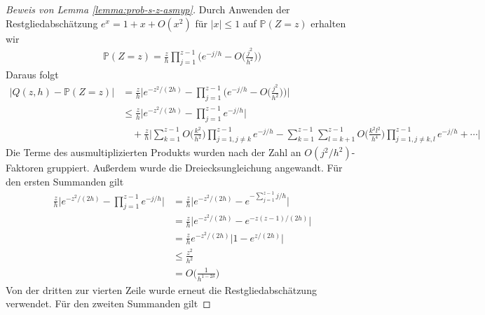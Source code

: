 \documentclass[a4paper, 11pt, ngerman]{article}
\renewcommand{\P}{\mathbb{P}}
\theoremstyle{definition}
\theoremstyle{plain}
\theoremstyle{remark}
\begin{document}
\begin{proof}[Beweis von Lemma \ref{lemma:prob-s-z-asmyp}]
    Durch Anwenden der Restgliedabschätzung $e^x = 1 + x + O(x^2)$ für $|x| \le 1$ auf $\P(Z = z)$ erhalten wir
    \begin{align*}
        \P(Z = z) = \frac z h \prod_{j = 1}^{z - 1}
        \Bigg ( e^{-j/h} - O \bigg (\frac {j^2} {h^2} \bigg ) \Bigg )
    \end{align*}
    Daraus folgt
    \begin{align*}
        \vert Q(z, h) - \P(Z = z) \vert
         & = \frac z h \Bigg \vert
        e^{-z^2/(2h)} -
        \prod_{j = 1}^{z - 1}
        \Bigg ( e^{-j/h} - O \bigg (\frac {j^2} {h^2} \bigg ) \Bigg )
        \Bigg \vert                      \\
         & \le \frac z h \Bigg \vert
        e^{-z^2/(2h)} -
        \prod_{j = 1}^{z - 1} e^{-j/h}
        \Bigg \vert                      \\
         & \quad + \frac z h \Bigg \vert
        \sum_{k = 1}^{z - 1} O \bigg ( \frac {k^2} {h^2} \bigg )
        \prod_{j = 1, j \ne k}^{z - 1} e^{-j/h}
        - \sum_{k = 1}^{z - 1}\sum_{l = k+1}^{z - 1}
        O \bigg ( \frac {k^2l^2} {h^4} \bigg )
        \prod_{j = 1, j \ne k,l}^{z - 1} e^{-j/h}
        + \cdots
        \Bigg \vert
    \end{align*}
    Die Terme des ausmultiplizierten Produkts wurden nach der Zahl an $O(j^2/h^2)$-Faktoren gruppiert. Außerdem wurde die Dreiecksungleichung angewandt. Für den ersten Summanden gilt
    \begin{align*}
        \frac z h \Bigg \vert
        e^{-z^2/(2h)} -
        \prod_{j = 1}^{z - 1} e^{-j/h}
        \Bigg \vert
         & = \frac z h \Big \vert
        e^{-z^2/(2h)} -
        e^{-\sum_{j = 1}^{z - 1} j/h}
        \Big \vert                                       \\
         & = \frac z h \Big \vert
        e^{-z^2/(2h)} -  e^{-z(z - 1)/(2h)}
        \Big \vert                                       \\
         & = \frac z h e^{-z^2/(2h)} \Big \vert
        1 - e^{z/(2h)}
        \Big \vert                                       \\
         & \le \frac {z^2} {h^2}                         \\
         & = O \bigg ( \frac 1 {h^{1 - 2\delta}} \bigg )
    \end{align*}
    Von der dritten zur vierten Zeile wurde erneut die Restgliedabschätzung verwendet. Für den zweiten Summanden gilt

\end{proof}
\end{document}

